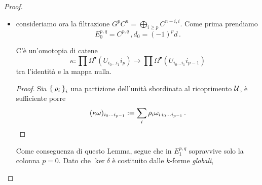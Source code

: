 \begin{ex}
\begin{proof}
\begin{itemize}
				\item consideriamo ora la filtrazione $G^{p}C^{n}=\bigoplus_{i \ge p} C^{n-i,i}$.
				Come prima prendiamo
				\begin{equation*}
					E_{0}^{p,q} = C^{p,q}\,, d_{0} = (-1)^{p}d\,.
				\end{equation*}
				
				\begin{lemma}
					C'è un'omotopia di catene
					\begin{equation*}
						\kappa : \prod \Omega^{\bullet} (U_{i_{0} \dots i_{1}} i_{p})
						\longrightarrow \prod \Omega^{\bullet} (U_{i_{0} \dots i_{1}} i_{p-1})
					\end{equation*}
					tra l'identità e la mappa nulla.
					\begin{proof}
						Sia $\Set{\rho_{i}}_{i}$ una partizione dell'unità
						sbordinata al ricoprimento $\mathcal{U}$, è sufficiente porre
						\begin{equation*}
							(\kappa \omega)_{i_{0} \dots i_{p-1}} 
							:= \sum_{i} \rho_{i} \omega_{i\,i_{0} \dots i_{p-1}}\,. \qedhere
						\end{equation*}
					\end{proof}
				\end{lemma}
				Come conseguenza di questo Lemma, segue che in $E^{p,q}_{1}$
				sopravvive solo la colonna $p=0$. 
				Dato che $\ker \delta$ è costituito dalle $k$-forme \emph{globali},
				
			\end{itemize}
		\end{proof}
\end{ex}




